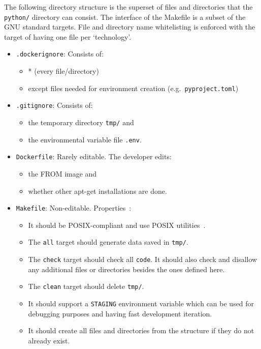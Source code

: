 \documentclass[journal]{IEEEtran}
\begin{document}
The following directory structure is the superset of files and directories that the \texttt{python/} directory can consist.
The interface of the Makefile is a subset of the GNU standard targets.
File and directory name whitelisting is enforced with the target of having one file per `technology'.
\begin{itemize}
	\item \texttt{.dockerignore}: Consists of:
		\begin{itemize}
			\item * (every file/directory)
			\item except files needed for environment creation (e.g.\ \texttt{pyproject.toml})
		\end{itemize}
	\item \texttt{.gitignore}: Consists of:
		\begin{itemize}
			\item the temporary directory \texttt{tmp/} and
			\item the environmental variable file \texttt{.env}.
		\end{itemize}
	\item \texttt{Dockerfile}: Rarely editable. The developer edits:
		\begin{itemize}
			\item the FROM image and
			\item whether other apt-get installations are done.
		\end{itemize}
	\item \texttt{Makefile}: Non-editable. Properties~\cite{stallman1992gnu}:
		\begin{itemize}
			\item It should be POSIX-compliant and use POSIX utilities~\cite{lewine1991posix}.
			\item The \texttt{all} target should generate data saved in \texttt{tmp/}.
			\item The \texttt{check} target should check all \texttt{code}. It should also check and disallow any additional files or directories besides the ones defined here.
			\item The \texttt{clean} target should delete \texttt{tmp/}.
			\item It should support a \texttt{STAGING} environment variable which can be used for debugging purposes and having fast development iteration.
			\item It should create all files and directories from the structure if they do not already exist.
		\end{itemize}

\end{itemize}
\end{document}
